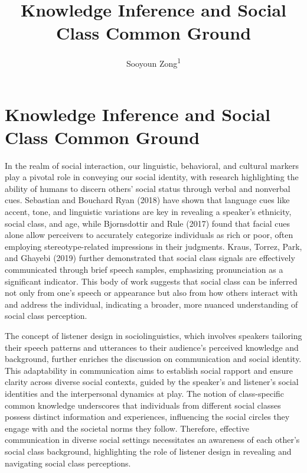 \documentclass[
  man,floatsintext]{apa6}
\title{Knowledge Inference and Social Class Common Ground}
\author{Sooyoun Zong\textsuperscript{1}}
\date{}
\affiliation{\vspace{0.5cm}\textsuperscript{1} University of Chicago}
\begin{document}
\maketitle

\hypertarget{knowledge-inference-and-social-class-common-ground}{%
\section{Knowledge Inference and Social Class Common Ground}\label{knowledge-inference-and-social-class-common-ground}}

In the realm of social interaction, our linguistic, behavioral, and cultural markers play a pivotal role in conveying our social identity, with research highlighting the ability of humans to discern others' social status through verbal and nonverbal cues. Sebastian and Bouchard Ryan (2018) have shown that language cues like accent, tone, and linguistic variations are key in revealing a speaker's ethnicity, social class, and age, while Bjornsdottir and Rule (2017) found that facial cues alone allow perceivers to accurately categorize individuals as rich or poor, often employing stereotype-related impressions in their judgments. Kraus, Torrez, Park, and Ghayebi (2019) further demonstrated that social class signals are effectively communicated through brief speech samples, emphasizing pronunciation as a significant indicator. This body of work suggests that social class can be inferred not only from one's speech or appearance but also from how others interact with and address the individual, indicating a broader, more nuanced understanding of social class perception.

The concept of listener design in sociolinguistics, which involves speakers tailoring their speech patterns and utterances to their audience's perceived knowledge and background, further enriches the discussion on communication and social identity. This adaptability in communication aims to establish social rapport and ensure clarity across diverse social contexts, guided by the speaker's and listener's social identities and the interpersonal dynamics at play. The notion of class-specific common knowledge underscores that individuals from different social classes possess distinct information and experiences, influencing the social circles they engage with and the societal norms they follow. Therefore, effective communication in diverse social settings necessitates an awareness of each other's social class background, highlighting the role of listener design in revealing and navigating social class perceptions.
\end{document}
